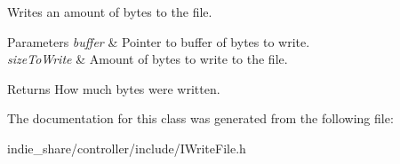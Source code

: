 Writes an amount of bytes to the file. 


\begin{DoxyParams}{Parameters}
{\em buffer} & Pointer to buffer of bytes to write. \\
\hline
{\em size\+To\+Write} & Amount of bytes to write to the file. \\
\hline
\end{DoxyParams}
\begin{DoxyReturn}{Returns}
How much bytes were written. 
\end{DoxyReturn}


The documentation for this class was generated from the following file\+:\begin{DoxyCompactItemize}
\item 
indie\+\_\+share/controller/include/I\+Write\+File.\+h\end{DoxyCompactItemize}

